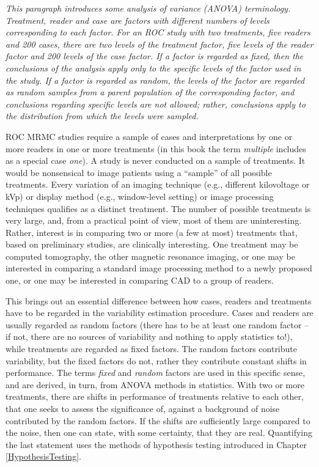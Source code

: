\documentclass[
]{book}
\begin{document}
\emph{This paragraph introduces some analysis of variance (ANOVA) terminology. Treatment, reader and case are factors with different numbers of levels corresponding to each factor. For an ROC study with two treatments, five readers and 200 cases, there are two levels of the treatment factor, five levels of the reader factor and 200 levels of the case factor. If a factor is regarded as fixed, then the conclusions of the analysis apply only to the specific levels of the factor used in the study. If a factor is regarded as random, the levels of the factor are regarded as random samples from a parent population of the corresponding factor, and conclusions regarding specific levels are not allowed; rather, conclusions apply to the distribution from which the levels were sampled.}

ROC MRMC studies require a sample of cases and interpretations by one or more readers in one or more treatments (in this book the term \emph{multiple} includes as a special case \emph{one}). A study is never conducted on a sample of treatments. It would be nonsensical to image patients using a ``sample'' of all possible treatments. Every variation of an imaging technique (e.g., different kilovoltage or kVp) or display method (e.g., window-level setting) or image processing techniques qualifies as a distinct treatment. The number of possible treatments is very large, and, from a practical point of view, most of them are uninteresting. Rather, interest is in comparing two or more (a few at most) treatments that, based on preliminary studies, are clinically interesting. One treatment may be computed tomography, the other magnetic resonance imaging, or one may be interested in comparing a standard image processing method to a newly proposed one, or one may be interested in comparing CAD to a group of readers.

This brings out an essential difference between how cases, readers and treatments have to be regarded in the variability estimation procedure. Cases and readers are usually regarded as random factors (there has to be at least one random factor -- if not, there are no sources of variability and nothing to apply statistics to!), while treatments are regarded as fixed factors. The random factors contribute variability, but the fixed factors do not, rather they contribute constant shifts in performance. The terms \emph{fixed} and \emph{random} factors are used in this specific sense, and are derived, in turn, from ANOVA methods in statistics. With two or more treatments, there are shifts in performance of treatments relative to each other, that one seeks to assess the significance of, against a background of noise contributed by the random factors. If the shifts are sufficiently large compared to the noise, then one can state, with some certainty, that they are real. Quantifying the last statement uses the methods of hypothesis testing introduced in Chapter \ref{HypothesisTesting}.
\end{document}
